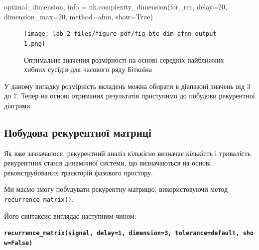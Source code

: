 \documentclass[
  letterpaper,
]{report}
\newenvironment{Shaded}{\begin{snugshade}}{\end{snugshade}}
\newcommand{\DecValTok}[1]{\textcolor[rgb]{0.68,0.00,0.00}{#1}}
\newcommand{\NormalTok}[1]{\textcolor[rgb]{0.00,0.23,0.31}{#1}}
\newcommand{\OperatorTok}[1]{\textcolor[rgb]{0.37,0.37,0.37}{#1}}
\newcommand{\StringTok}[1]{\textcolor[rgb]{0.13,0.47,0.30}{#1}}
\newcommand{\VariableTok}[1]{\textcolor[rgb]{0.07,0.07,0.07}{#1}}
\begin{document}
\begin{Shaded}
\begin{Highlighting}[]
\NormalTok{optimal\_dimension, info }\OperatorTok{=}\NormalTok{ nk.complexity\_dimension(for\_rec,}
\NormalTok{                                                  delay}\OperatorTok{=}\DecValTok{20}\NormalTok{,}
\NormalTok{                                                  dimension\_max}\OperatorTok{=}\DecValTok{20}\NormalTok{,}
\NormalTok{                                                  method}\OperatorTok{=}\StringTok{\textquotesingle{}afnn\textquotesingle{}}\NormalTok{,}
\NormalTok{                                                  show}\OperatorTok{=}\VariableTok{True}\NormalTok{)}
\end{Highlighting}
\end{Shaded}

\begin{figure}[H]

{\centering \texttt{[image: lab\_2\_files/figure-pdf/fig-btc-dim-afnn-output-1.png]}

}

\caption{\label{fig-btc-dim-afnn}Оптимальне значення розмірності на
основі середніх найближчих хибних сусідів для часового ряду Біткоїна}

\end{figure}

У даному випадку розмірність вкладень можна обирати в діапазоні значень
від 3 до 7. Тепер на основі отриманих результатів приступимо до побудови
рекурентної діаграми.

\hypertarget{ux43fux43eux431ux443ux434ux43eux432ux430-ux440ux435ux43aux443ux440ux435ux43dux442ux43dux43eux457-ux43cux430ux442ux440ux438ux446ux456}{%
\subsection{Побудова рекурентної
матриці}\label{ux43fux43eux431ux443ux434ux43eux432ux430-ux440ux435ux43aux443ux440ux435ux43dux442ux43dux43eux457-ux43cux430ux442ux440ux438ux446ux456}}

Як вже зазначалося, рекурентний аналіз кількісно визначає кількість і
тривалість рекурентних станів динамічної системи, що визначаються на
основі реконструйованих траєкторій фазового простору.

Ми маємо змогу побудувати рекурентну матрицю, використовуючи метод
\texttt{recurrence\_matrix()}.

Його синтаксис виглядає наступним чином:

\textbf{\texttt{recurrence\_matrix(signal,\ delay=1,\ dimension=3,\ tolerance=\textquotesingle{}default\textquotesingle{},\ show=False)}}
\end{document}
